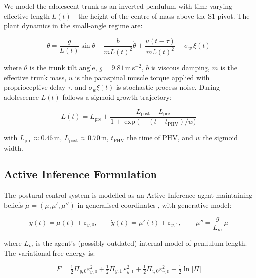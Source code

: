 \documentclass[12pt, letterpaper]{article}
\newcommand{\Piy}{\Pi_{y,1}}
\newcommand{\epsy}{\varepsilon_{y,1}}
\newcommand{\Lm}{L_m}
\begin{document}
We model the adolescent trunk as an inverted pendulum with time-varying effective
length $L(t)$---the height of the centre of mass above the S1 pivot. The plant
dynamics in the small-angle regime are:

\begin{equation}
  \ddot{\theta} = \frac{g}{L(t)}\sin\theta
    - \frac{b}{mL(t)^{2}}\dot{\theta}
    + \frac{u(t-\tau)}{mL(t)^{2}}
    + \sigma_w\,\xi(t)
  \label{eq:plant}
\end{equation}

where $\theta$ is the trunk tilt angle, $g = 9.81$\,m\,s$^{-2}$, $b$ is viscous
damping, $m$ is the effective trunk mass, $u$ is the paraspinal muscle torque
applied with proprioceptive delay $\tau$, and $\sigma_w\xi(t)$ is stochastic
process noise. During adolescence $L(t)$ follows a sigmoid growth trajectory:

\begin{equation}
  L(t) = L_{\mathrm{pre}}
    + \frac{L_{\mathrm{post}} - L_{\mathrm{pre}}}
           {1 + \exp\!\bigl(-(t - t_{\mathrm{PHV}})/w\bigr)}
  \label{eq:growth}
\end{equation}

with $L_{\mathrm{pre}} \approx 0.45$\,m, $L_{\mathrm{post}} \approx 0.70$\,m,
$t_{\mathrm{PHV}}$ the time of PHV, and $w$ the sigmoid width.

\subsection{Active Inference Formulation}

The postural control system is modelled as an Active Inference agent maintaining
beliefs $\tilde{\mu} = (\mu, \mu', \mu'')$ in generalised coordinates
\citep{Friston2010}, with generative model:

\begin{equation}
  y(t) = \mu(t) + \varepsilon_{y,0}, \qquad
  \dot{y}(t) = \mu'(t) + \varepsilon_{y,1}, \qquad
  \mu'' = \frac{g}{\Lm}\,\mu
  \label{eq:genmodel}
\end{equation}

where $\Lm$ is the agent's (possibly outdated) internal model of pendulum length.
The variational free energy is:

\begin{equation}
  F = \tfrac{1}{2}\Pi_{y,0}\varepsilon_{y,0}^{2}
    + \tfrac{1}{2}\Piy\,\epsy^{2}
    + \tfrac{1}{2}\Pi_{v,0}\varepsilon_{v,0}^{2}
    - \tfrac{1}{2}\ln|\Pi|
  \label{eq:FE}
\end{equation}
\end{document}
